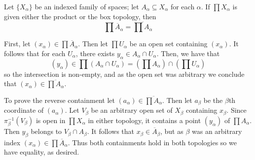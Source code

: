 \documentclass[12pt, a4paper, twoside, openright, titlepage]{book}
\begin{document}
\begin{thm}{}{}
    Let $\{X_{\alpha}\}$ be an indexed family of spaces; let $A_{\alpha} \subseteq X_{\alpha}$ for each $\alpha$. If $\prod X_{\alpha}$ is given either the product or the box topology, then \begin{equation*}
        \prod \overline{A}_{\alpha} = \overline{\prod A_{\alpha}}
    \end{equation*}
\end{thm}
\begin{proof*}{}{}
    First, let $(x_{\alpha}) \in \prod \overline{A}_{\alpha}$. Then let $\prod U_{\alpha}$ be an open set containing $(x_{\alpha})$. It follows that for each $U_{\alpha}$, there exists $y_{\alpha} \in A_{\alpha} \cap U_{\alpha}$. Then, we have that $$(y_{\alpha}) \in \prod (A_{\alpha} \cap U_{\alpha}) = \left(\prod A_{\alpha}\right)\cap \left(\prod U_{\alpha}\right)$$
    so the intersection is non-empty, and as the open set was arbitrary we conclude that $(x_{\alpha}) \in \overline{\prod A_{\alpha}}$. 

    To prove the reverse containment let $(a_{\alpha}) \in \overline{\prod A_{\alpha}}$. Then let $a_{\beta}$ be the $\beta$th coordinate of $(a_{\alpha})$. Let $V_{\beta}$ be an arbitrary open set of $X_{\beta}$ containing $x_{\beta}$. Since $\pi^{-1}_{\beta}(V_{\beta})$ is open in $\prod X_{\alpha}$ in either topology, it contains a point $(y_{\alpha})$ of $\prod A_{\alpha}$. Then $y_{\beta}$ belongs to $V_{\beta}\cap A_{\beta}$. It follows that $x_{\beta} \in \overline{A}_{\beta}$, but as $\beta$ was an arbitrary index $(x_{\alpha}) \in \prod \overline{A}_{\alpha}$. Thus both containments hold in both topologies so we have equality, as desired.
\end{proof*}
\end{document}
